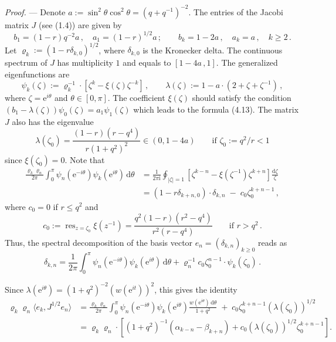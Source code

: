 \documentclass[11pt]{article}
\theoremstyle{plain}
\begin{document}
\medskip
\noindent\emph{Proof.} --- Denote $a := \sin^2\theta\cos^2\theta = (q+q^{-1})^{-2}$. The entries of the
Jacobi matrix $J$ (see (1.4)) are given by
\[
b_1 = (1-r)q^{-2}a \,, \quad a_1 = (1-r)^{1/2}a \,; \qquad b_k = 1-2a \,, \quad a_k = a \,, \quad k \geqslant 2 \,.
\]
Let $\varrho_k := (1-r\delta_{k,0})^{1/2}$, where $\delta_{k,0}$ is the Kronecker delta. The continuous
spectrum of $J$ has multiplicity $1$ and equals to $[1-4a\,,1]$. The generalized eigenfunctions are
\[
\psi_k(\zeta) := \varrho_k^{-1}\cdot\left[\zeta^k - \xi(\zeta)\zeta^{-k}\right] \,, \qquad
\lambda(\zeta) := 1 - a\cdot(2+\zeta+\zeta^{-1}) \,,
\]
where $\zeta = \mathrm{e}^{i\theta}$ and $\theta \in [0,\pi]$. The coefficient $\xi(\zeta)$ should satisfy the
condition $(b_1-\lambda(\zeta))\psi_0(\zeta) = a_1\psi_1(\zeta)$ which leads to the formula (4.13). The matrix
$J$ also has the eigenvalue
\[
\lambda(\zeta_0) = \frac{(1-r)(r-q^4)}{r(1+q^2)^2} \in (0,1-4a) \qquad \text{if } \zeta_0 := q^2/r < 1
\]
since $\xi(\zeta_0) = 0$. Note that
\begin{align*}
\frac{\varrho_k\varrho_n}{2\pi}\int_0^{\pi} \psi_n(\mathrm{e}^{-i\theta})\psi_k(\mathrm{e}^{i\theta})\,\mathrm{d}\theta
& = \frac{1}{2\pi \mathrm{i}}\oint_{|\zeta|=1} \left[\zeta^{k-n} - \xi(\zeta^{-1})\zeta^{k+n}\right]\frac{\mathrm{d}\zeta}{\zeta} \\
& = (1-r\delta_{k+n,0})\cdot\delta_{k,n} \;-\; c_0\zeta_0^{k+n-1} \,,
\end{align*}
where $c_0 = 0$ if $r \leqslant q^2$ and
\[
c_0 := \operatorname{res}_{z=\zeta_0}\xi(z^{-1}) = \frac{q^2(1-r)(r^2-q^4)}{r^2(r-q^4)} \qquad \text{if } r > q^2 \,.
\]
Thus, the spectral decomposition of the basis vector $e_n = (\delta_{k,n})_{k\geqslant 0}$ reads as
\[
\delta_{k,n} = \frac{1}{2\pi}\int_0^{\pi} \psi_n(\mathrm{e}^{-i\theta})\psi_k(\mathrm{e}^{i\theta})\,\mathrm{d}\theta
+ \varrho_n^{-1}c_0\zeta_0^{n-1}\cdot\psi_k(\zeta_0) \,.
\]



Since $\lambda(\mathrm{e}^{i\theta}) = (1+q^2)^{-2}(w(\mathrm{e}^{it}))^2$, this gives the identity
\begin{align*}
\varrho_k\varrho_n\langle e_k, J^{1/2}e_n\rangle
& = \frac{\varrho_k\varrho_n}{2\pi}\int_0^{\pi} \psi_n(\mathrm{e}^{-i\theta})\psi_k(\mathrm{e}^{i\theta})
    \frac{w(\mathrm{e}^{i\theta})\,\mathrm{d}\theta}{1+q^2} \;+\; c_0\zeta_0^{k+n-1}(\lambda(\zeta_0))^{1/2} \\
& = \varrho_k\varrho_n\cdot\left[(1+q^2)^{-1}(\alpha_{k-n}-\beta_{k+n}) + c_0(\lambda(\zeta_0))^{1/2}\zeta_0^{k+n-1}\right].
\end{align*}
\end{document}
